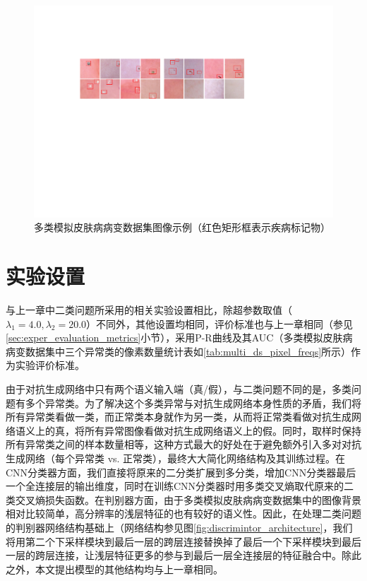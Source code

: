 \begin{figure}[h]
	\centering
	\includegraphics[width=1.0\textwidth]{figure/multi_classes_simulated_skin.pdf}
	\caption{多类模拟皮肤病病变数据集图像示例（红色矩形框表示疾病标记物）}
	\label{fig:mul_classes_simulated_ds}
\end{figure}

\section{实验设置}\label{sec:multi_classes_experiment_setting}
与上一章中二类问题所采用的相关实验设置相比，除超参数取值（$\lambda_{1}=4.0,\lambda_{2}=20.0$）不同外，其他设置均相同，评价标准也与上一章相同（参见\ref{sec:exper_evaluation_metrics}小节），采用P-R曲线及其AUC（多类模拟皮肤病病变数据集中三个异常类的像素数量统计表如\ref{tab:multi_ds_pixel_freqs}所示）作为实验评价标准。

由于对抗生成网络中只有两个语义输入端（真/假），与二类问题不同的是，多类问题有多个异常类。为了解决这个多类异常与对抗生成网络本身性质的矛盾，我们将所有异常类看做一类，而正常类本身就作为另一类，从而将正常类看做对抗生成网络语义上的真，将所有异常图像看做对抗生成网络语义上的假。同时，取样时保持所有异常类之间的样本数量相等，这种方式最大的好处在于避免额外引入多对对抗生成网络（每个异常类 vs. 正常类），最终大大简化网络结构及其训练过程。在CNN分类器方面，我们直接将原来的二分类扩展到多分类，增加CNN分类器最后一个全连接层的输出维度，同时在训练CNN分类器时用多类交叉熵取代原来的二类交叉熵损失函数。在判别器方面，由于多类模拟皮肤病病变数据集中的图像背景相对比较简单，高分辨率的浅层特征的也有较好的语义性。因此，在处理二类问题的判别器网络结构基础上（网络结构参见图\ref{fig:discrimintor_architecture}，我们将用第二个下采样模块到最后一层的跨层连接替换掉了最后一个下采样模块到最后一层的跨层连接，让浅层特征更多的参与到最后一层全连接层的特征融合中。除此之外，本文提出模型的其他结构均与上一章相同。

